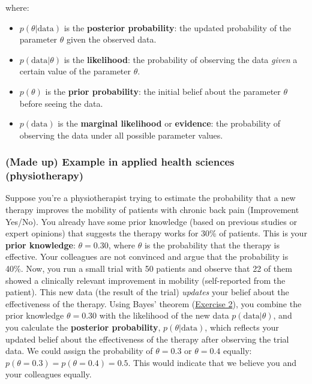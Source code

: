 \documentclass[
]{book}
\begin{document}
where:

\begin{itemize}
\item
  \(p(\theta | \text{data})\) is the \textbf{posterior probability}: the updated probability of the parameter \(\theta\) given the observed data.
\item
  \(p(\text{data} | \theta)\) is the \textbf{likelihood}: the probability of observing the data \emph{given} a certain value of the parameter \(\theta\).
\item
  \(p(\theta)\) is the \textbf{prior probability}: the initial belief about the parameter \(\theta\) before seeing the data.
\item
  \(p(\text{data})\) is the \textbf{marginal likelihood} or \textbf{evidence}: the probability of observing the data under all possible parameter values.
\end{itemize}

\subsubsection{(Made up) Example in applied health sciences (physiotherapy)}\label{example1_physio}

Suppose you're a physiotherapist trying to estimate the probability that a new therapy improves the mobility of patients with chronic back pain (Improvement Yes/No).
You already have some prior knowledge (based on previous studies or expert opinions) that suggests the therapy works for 30\% of patients.
This is your \textbf{prior knowledge}: \(\theta = 0.30\), where \(\theta\) is the probability that the therapy is effective.
Your colleagues are not convinced and argue that the probability is 40\%.
Now, you run a small trial with 50 patients and observe that 22 of them showed a clinically relevant improvement in mobility (self-reported from the patient).
This new data (the result of the trial) \emph{updates} your belief about the effectiveness of the therapy.
Using Bayes' theorem (\hyperref[exercise2]{Exercise 2}), you combine the prior knowledge \(\theta = 0.30\) with the likelihood of the new data \(p(\text{data} | \theta)\), and you calculate
the \textbf{posterior probability}, \(p(\theta | \text{data})\), which reflects your updated belief about the effectiveness of the therapy after observing the trial data.
We could assign the probability of \(\theta = 0.3\) or \(\theta = 0.4\) equally: \(p(\theta = 0.3) = p(\theta = 0.4) = 0.5.\)
This would indicate that we believe you and your colleagues equally.
\end{document}
